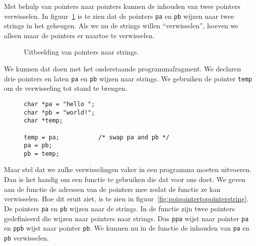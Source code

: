 Met behulp van pointers naar pointers kunnen de inhouden van twee pointers verwisselen. In figuur~\ref{fig:poipointertostring} is te zien dat de pointers \texttt{pa} en \texttt{pb} wijzen naar twee strings in het geheugen. Als we nu de strings willen ``verwisselen'', hoeven we alleen maar de pointers er naartoe te verwisselen.

\begin{figure}[!ht]
\centering
{}
\caption{Uitbeelding van pointers naar strings.}
\label{fig:poipointertostring}
\end{figure}

We kunnen dat doen met het onderstaande programmafragment. We declaren drie pointers en laten \texttt{pa} en \texttt{pb} wijzen naar strings. We gebruiken de pointer \texttt{temp} om de verwisseling tot stand te brengen.

\begin{figure}[H]
\begin{lstlisting}[caption=Verwisselen van twee pointers.]
char *pa = "hello ";
char *pb = "world!";
char *temp;

temp = pa;           /* swap pa and pb */
pa = pb;
pb = temp;
\end{lstlisting}
\end{figure}

Maar stel dat we zulke verwisselingen vaker in een programma moeten uitvoeren. Dan is het handig om een functie te gebruiken die dat voor ons doet. We geven aan de functie de adressen van de pointers mee zodat de functie ze kan verwisselen. Hoe dit eruit ziet, is te zien in figuur~\ref{fig:poipointertopointerstring}. De pointers \texttt{pa} en \texttt{pb} wijzen naar de strings. In de functie zijn twee pointers gedefinieerd die wijzen naar pointers naar strings. Dus \texttt{ppa} wijst naar pointer \texttt{pa} en \texttt{ppb} wijst naar pointer \texttt{pb}. We kunnen nu in de functie de inhouden van \texttt{pa} en \texttt{pb} verwisselen.

